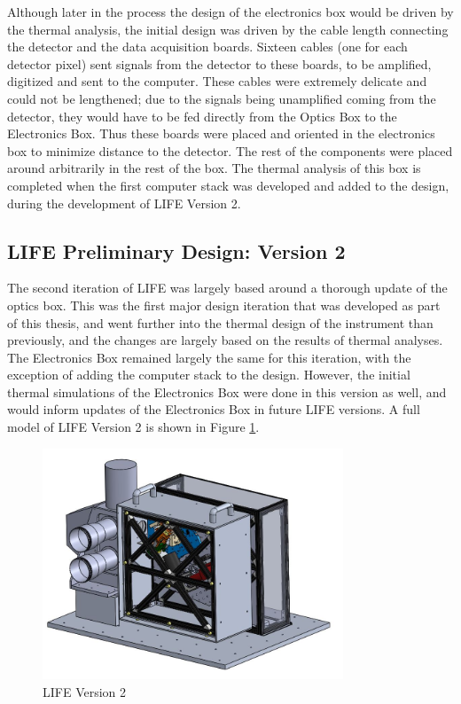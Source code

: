 Although later in the process the design of the electronics box would be driven by the thermal analysis, the initial design was driven by the cable length connecting the detector and the data acquisition boards. Sixteen cables (one for each detector pixel) sent signals from the detector to these boards, to be amplified, digitized and sent to the computer. These cables were extremely delicate and could not be lengthened; due to the signals being unamplified coming from the detector, they would have to be fed directly from the Optics Box to the Electronics Box. Thus these boards were placed and oriented in the electronics box to minimize distance to the detector. The rest of the components were placed around arbitrarily in the rest of the box. The thermal analysis of this box is completed when the first computer stack was developed and added to the design, during the development of LIFE Version 2.

\subsection{LIFE Preliminary Design: Version 2}
The second iteration of LIFE was largely based around a thorough update of the optics box. This was the first major design iteration that was developed as part of this thesis, and went further into the thermal design of the instrument than previously, and the changes are largely based on the results of thermal analyses. The Electronics Box remained largely the same for this iteration, with the exception of adding the computer stack to the design. However, the initial thermal simulations of the Electronics Box were done in this version as well, and would inform updates of the Electronics Box in future LIFE versions. A full model of LIFE Version 2 is shown in Figure \ref{fig:LIFE_V2}.

\begin{figure} %
    \centering
    \includegraphics[width=0.8\textwidth]{chap3_images/LIFE_V2_images/LIFE_V2.png}
    \caption{LIFE Version 2}
    \label{fig:LIFE_V2}
\end{figure}

